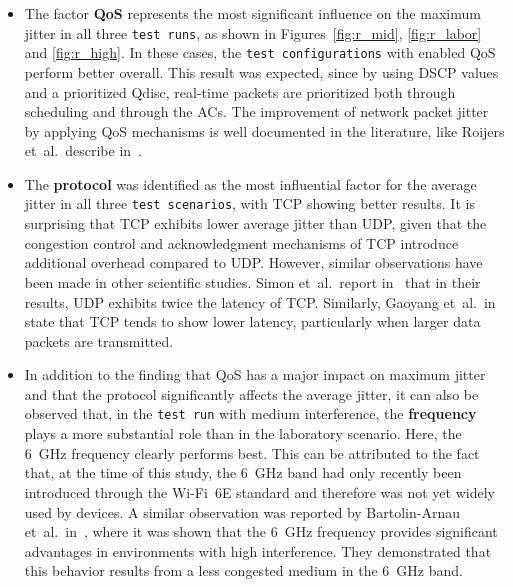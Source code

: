 \begin{itemize}  
\item The factor \textbf{\ac{QoS}} represents the most significant influence on the maximum jitter in all three \texttt{test runs}, as shown in Figures~\ref{fig:r_mid}, \ref{fig:r_labor} and \ref{fig:r_high}.  
In these cases, the \texttt{test configurations} with enabled \ac{QoS} perform better overall.  
This result was expected, since by using \ac{DSCP} values and a prioritized \ac{Qdisc}, real-time packets are prioritized both through scheduling and through the \acp{AC}.  
The improvement of network packet jitter by applying \ac{QoS} mechanisms is well documented in the literature, like Roijers et~al.\ describe in~\cite[p.~2627]{ROIJERS20062621}.  

\item The \textbf{protocol} was identified as the most influential factor for the average jitter in all three \texttt{test scenarios}, with \ac{TCP} showing better results.  
It is surprising that \ac{TCP} exhibits lower average jitter than \ac{UDP}, given that the congestion control and acknowledgment mechanisms of \ac{TCP} introduce additional overhead compared to \ac{UDP}.  
However, similar observations have been made in other scientific studies.  
Simon et~al.\ report in~\cite[p.~227--228]{tcp_vs_udp} that in their results, \ac{UDP} exhibits twice the latency of \ac{TCP}.  
Similarly, Gaoyang et~al.\ in~\cite[p.~11]{tcp_vs_ud} state that \ac{TCP} tends to show lower latency, particularly when larger data packets are transmitted.  

\item In addition to the finding that \ac{QoS} has a major impact on maximum jitter and that the protocol significantly affects the average jitter, it can also be observed that, in the \texttt{test run} with medium interference, the \textbf{frequency} plays a more substantial role than in the laboratory scenario.  
Here, the 6~GHz frequency clearly performs best.  
This can be attributed to the fact that, at the time of this study, the 6~GHz band had only recently been introduced through the Wi-Fi~6E standard and therefore was not yet widely used by devices.  
A similar observation was reported by Bartolin-Arnau et~al.\ in~\cite[p.~14--17]{telecom6020040}, where it was shown that the 6~GHz frequency provides significant advantages in environments with high interference.  
They demonstrated that this behavior results from a less congested medium in the 6~GHz band.  


\end{itemize}

